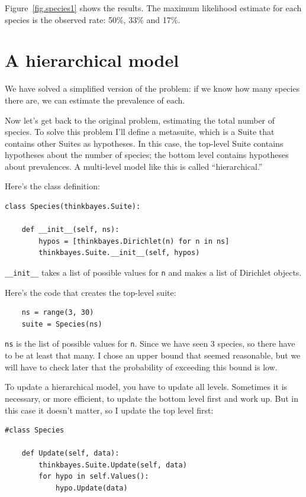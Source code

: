 \documentclass[12pt]{book}
\begin{document}
Figure~\ref{fig.species1} shows the results.  The maximum
likelihood estimate for each species is the observed rate:
50\%, 33\% and 17\%.


\section{A hierarchical model}

We have solved a simplified version of the problem: if we
know how many species there are, we can estimate the prevalence
of each.

Now let's get back to the original problem, estimating the total
number of species.  To solve this problem I'll define a metasuite,
which is a Suite that contains other Suites as hypotheses.  In this
case, the top-level Suite contains hypotheses about the number of
species; the bottom level contains hypotheses about prevalences.
A multi-level model like this is called ``hierarchical.''

Here's the class definition:

\begin{verbatim}
class Species(thinkbayes.Suite):

    def __init__(self, ns):
        hypos = [thinkbayes.Dirichlet(n) for n in ns]
        thinkbayes.Suite.__init__(self, hypos)
\end{verbatim}

\verb"__init__" takes a list of possible values for {\tt n} and
makes a list of Dirichlet objects.

Here's the code that creates the top-level suite:

\begin{verbatim}
    ns = range(3, 30)
    suite = Species(ns)
\end{verbatim}

{\tt ns} is the list of possible values for {\tt n}.
Since we have seen 3 species, so there have to be at least
that many.  I chose an upper bound that seemed reasonable, but we will
have to check later that the probability of exceeding this
bound is low.

To update a hierarchical model, you have to update all levels.
Sometimes it is necessary, or more efficient, to update the bottom
level first and work up.  But in this case it doesn't matter, so
I update the top level first:

\begin{verbatim}
#class Species

    def Update(self, data):
        thinkbayes.Suite.Update(self, data)
        for hypo in self.Values():
            hypo.Update(data)
\end{verbatim}
\end{document}
